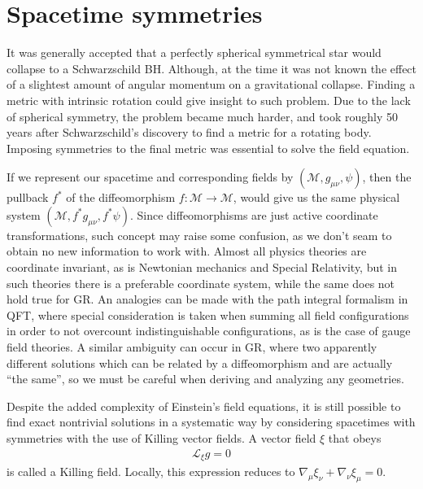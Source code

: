 \section{Spacetime symmetries}

It was generally accepted that a perfectly spherical symmetrical star would collapse to a Schwarzschild BH. 
Although, at the time it was not known the effect of a slightest amount of angular momentum on a gravitational collapse.
Finding a metric with intrinsic rotation could give insight to such problem. Due to the lack of spherical symmetry, the problem became much harder, and took roughly 50 years after Schwarzschild's discovery to find a metric for a rotating body.
Imposing symmetries to the final metric was essential to solve the field equation.

If we represent our spacetime and corresponding fields by $(\mathcal{M}, g_{\mu\nu}, \psi)$, then the pullback $f^*$ of the diffeomorphism $f:\mathcal{M}\rightarrow\mathcal{M}$, would give us the same physical system $(\mathcal{M}, f^* g_{\mu\nu}, f^* \psi)$.
Since diffeomorphisms are just active coordinate transformations, such concept may raise some confusion, as we don't seam to obtain no new information to work with. 
Almost all physics theories are coordinate invariant, as is Newtonian mechanics and Special Relativity, but in such theories there is a preferable coordinate system, while the same does not hold true for GR.
An analogies can be made with the path integral formalism in QFT, where special consideration is taken when summing all field configurations in order to not overcount indistinguishable configurations, as is the case of gauge field theories.
A similar ambiguity can occur in GR, where two apparently different solutions which can be related by a diffeomorphism and are actually ``the same'', so we must be careful when deriving and analyzing any geometries.

Despite the added complexity of Einstein's field equations, it is still possible to find exact nontrivial solutions in a systematic way by considering spacetimes with symmetries with the use of Killing vector fields.
A vector field $\xi$ that obeys
\begin{align}
    \mathcal{L}_\xi  g = 0  
    \label{eq2:killing}
\end{align}
is called a Killing field. Locally, this expression reduces to $\nabla_\mu \xi_\nu + \nabla_\nu \xi_\mu = 0$.

